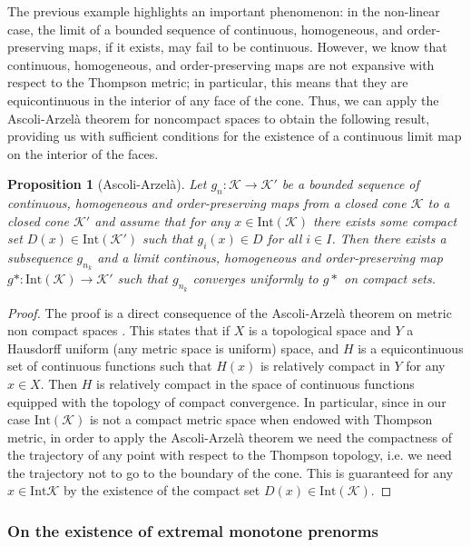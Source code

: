 \documentclass{article}
\newtheorem{proposition}[theorem]{Proposition}
\newcommand{\cone}{\mathcal{K}}
\newcommand{\interior}{\mathrm{Int}}
\begin{document}
%
%
The previous example highlights an important phenomenon:  in the non-linear case, the limit of a bounded sequence of continuous, homogeneous, and order-preserving maps, if it exists, may fail to be continuous. However, we know that continuous, homogeneous, and order-preserving maps are not expansive with respect to the Thompson metric; in particular, this means that they are equicontinuous in the interior of any face of the cone. Thus, we can apply the Ascoli-Arzelà theorem for noncompact spaces to obtain the following result, providing us with sufficient conditions for the existence of a continuous limit map on the interior of the faces.
%

\begin{proposition}[Ascoli-Arzelà]\label{Prop_ascoli_arzela}
    Let $g_n:\cone\rightarrow \cone'$ be a bounded sequence of continuous, homogeneous and order-preserving maps from a closed cone $\cone$ to a closed cone $\cone'$ and assume that for any $x\in \interior(\cone)$ there exists some compact set $D(x)\in \interior(\cone')$ such that $g_i(x)\in D$ for all $i\in I$. Then there exists a subsequence $g_{n_k}$ and a limit continous, homogeneous and order-preserving map $g*:\interior(\cone)\rightarrow \cone'$ such that $g_{n_k}$ converges uniformly to $g*$ on compact sets.
\end{proposition}
\begin{proof}
    The proof is a direct consequence of the Ascoli-Arzelà theorem on metric non compact spaces \cite{bourbakigeneral}. This states that if
 $X$ is a topological space and $Y$ a Hausdorff uniform (any metric space is uniform)  space, and $H$ is a equicontinuous set of continuous functions such that $H(x)$ is relatively compact in $Y$ for any $x\in X$. Then $H$ is relatively compact in the space of continuous functions equipped with the topology of compact convergence. In particular, since in our case $\interior(\cone)$ is not a compact metric space when endowed with Thompson metric, in order to apply the Ascoli-Arzelà theorem we need the compactness of the trajectory of any point with respect to the Thompson topology, i.e. we need the trajectory not to go to the boundary of the cone. This is guaranteed for any $x\in \interior\cone$ by the existence of the compact set $D(x)\in \interior(\cone)$.
\end{proof}
%
%


\subsubsection{On the existence of extremal monotone prenorms}
\end{document}
